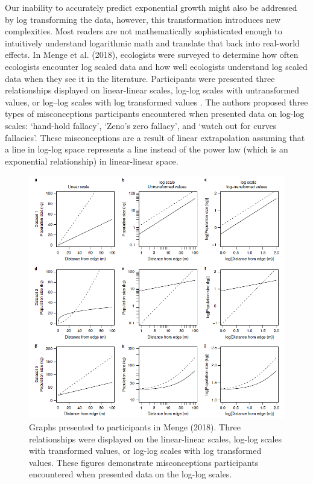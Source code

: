 \documentclass[print]{nuthesis}
\begin{document}
Our inability to accurately predict exponential growth might also be addressed by log transforming the data, however, this transformation introduces new complexities.
Most readers are not mathematically sophisticated enough to intuitively understand logarithmic math and translate that back into real-world effects.
In Menge et al. (2018), ecologists were surveyed to determine how often ecologists encounter log scaled data and how well ecologists understand log scaled data when they see it in the literature.
Participants were presented three relationships displayed on linear-linear scales, log-log scales with untransformed values, or log--log scales with log transformed values .
The authors proposed three types of misconceptions participants encountered when presented data on log-log scales: `hand-hold fallacy', `Zeno's zero fallacy', and `watch out for curves fallacies'.
These misconceptions are a result of linear extrapolation assuming that a line in log-log space represents a line instead of the power law (which is an exponential relationship) in linear-linear space.

\begin{figure}[tbp]

{\centering \includegraphics[width=1\linewidth,]{images/menge-plots} 

}

\caption[Graphs viewed in Menge (2018) survey]{Graphs presented to participants in Menge (2018). Three relationships were displayed on the linear-linear scales, log-log scales with transformed values, or log-log scales with log transformed values. These figures demonstrate misconceptions participants encountered when presented data on the log-log scales.}\label{fig:menge-plots}
\end{figure}
\end{document}
